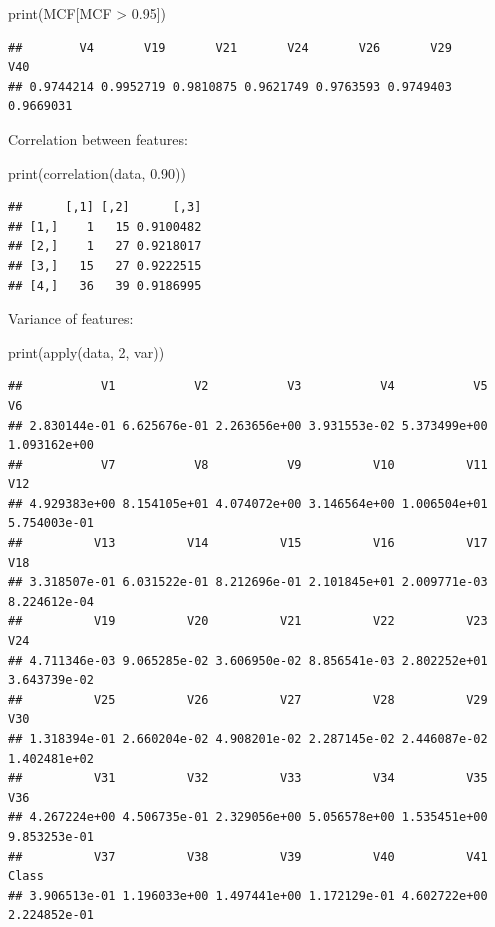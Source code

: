 \documentclass[
]{article}
\newenvironment{Shaded}{\begin{snugshade}}{\end{snugshade}}
\newcommand{\DecValTok}[1]{\textcolor[rgb]{0.00,0.00,0.81}{#1}}
\newcommand{\FloatTok}[1]{\textcolor[rgb]{0.00,0.00,0.81}{#1}}
\newcommand{\FunctionTok}[1]{\textcolor[rgb]{0.00,0.00,0.00}{#1}}
\newcommand{\NormalTok}[1]{#1}
\newcommand{\SpecialCharTok}[1]{\textcolor[rgb]{0.00,0.00,0.00}{#1}}
\begin{document}
\begin{Shaded}
\begin{Highlighting}[]
\FunctionTok{print}\NormalTok{(MCF[MCF }\SpecialCharTok{\textgreater{}} \FloatTok{0.95}\NormalTok{])}
\end{Highlighting}
\end{Shaded}

\begin{verbatim}
##        V4       V19       V21       V24       V26       V29       V40 
## 0.9744214 0.9952719 0.9810875 0.9621749 0.9763593 0.9749403 0.9669031
\end{verbatim}

Correlation between features:

\begin{Shaded}
\begin{Highlighting}[]
\FunctionTok{print}\NormalTok{(}\FunctionTok{correlation}\NormalTok{(data, }\FloatTok{0.90}\NormalTok{))}
\end{Highlighting}
\end{Shaded}

\begin{verbatim}
##      [,1] [,2]      [,3]
## [1,]    1   15 0.9100482
## [2,]    1   27 0.9218017
## [3,]   15   27 0.9222515
## [4,]   36   39 0.9186995
\end{verbatim}

Variance of features:

\begin{Shaded}
\begin{Highlighting}[]
\FunctionTok{print}\NormalTok{(}\FunctionTok{apply}\NormalTok{(data, }\DecValTok{2}\NormalTok{, var))}
\end{Highlighting}
\end{Shaded}

\begin{verbatim}
##           V1           V2           V3           V4           V5           V6 
## 2.830144e-01 6.625676e-01 2.263656e+00 3.931553e-02 5.373499e+00 1.093162e+00
##           V7           V8           V9          V10          V11          V12
## 4.929383e+00 8.154105e+01 4.074072e+00 3.146564e+00 1.006504e+01 5.754003e-01
##          V13          V14          V15          V16          V17          V18
## 3.318507e-01 6.031522e-01 8.212696e-01 2.101845e+01 2.009771e-03 8.224612e-04
##          V19          V20          V21          V22          V23          V24 
## 4.711346e-03 9.065285e-02 3.606950e-02 8.856541e-03 2.802252e+01 3.643739e-02
##          V25          V26          V27          V28          V29          V30
## 1.318394e-01 2.660204e-02 4.908201e-02 2.287145e-02 2.446087e-02 1.402481e+02
##          V31          V32          V33          V34          V35          V36
## 4.267224e+00 4.506735e-01 2.329056e+00 5.056578e+00 1.535451e+00 9.853253e-01
##          V37          V38          V39          V40          V41        Class
## 3.906513e-01 1.196033e+00 1.497441e+00 1.172129e-01 4.602722e+00 2.224852e-01
\end{verbatim}
\end{document}
